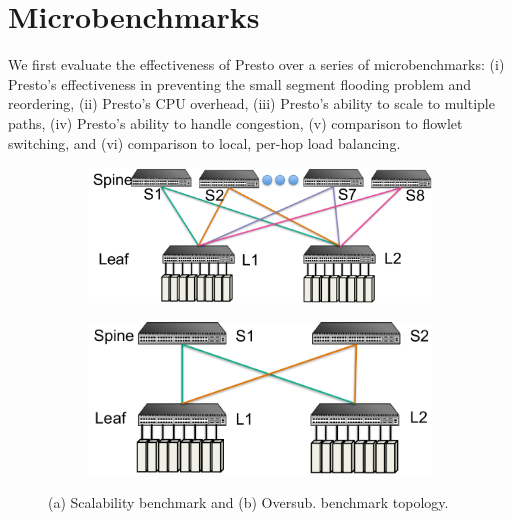 \section{Microbenchmarks}
\label{sec:micro}

We first evaluate the effectiveness of Presto over a series of microbenchmarks: %
(i) Presto's effectiveness in preventing the small segment
flooding problem and reordering, (ii) Presto's CPU overhead, (iii) Presto's ability to scale
to multiple paths, (iv) Presto's ability to handle congestion, (v) comparison to flowlet
switching, and (vi) comparison to local, per-hop load balancing.

\begin{figure}[!t]
        \centering
	\begin{subfigure}[b]{0.45\textwidth}
        	\centering
  		\includegraphics[width=\textwidth]{presto/figures/micro_test_topology/micro_scalabilitytest_topology_refined.pdf}
        	\caption{}
		\label{micro_scalability_topology}
	\end{subfigure}
	\begin{subfigure}[b]{0.45\textwidth}
                \centering
		\includegraphics[width=\textwidth]{presto/figures/micro_test_topology/micro_congestiontest_topology_refined.pdf}
        	\caption{}
		\label{micro_congestion_topology}
	\end{subfigure}
	\caption{(a) Scalability benchmark and (b) Oversub. benchmark topology.}
	\label{micro_topology}
\end{figure}

